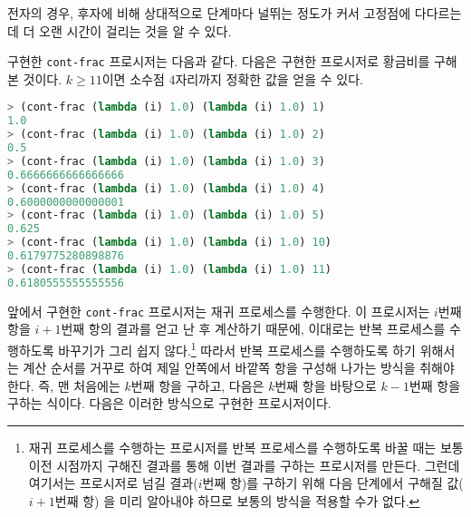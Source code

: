 전자의 경우, 후자에 비해 상대적으로 단계마다 널뛰는 정도가 커서 고정점에
다다르는데 더 오랜 시간이 걸리는 것을 알 수 있다.


\begin{MyEnum}
\item 구현한 \texttt{cont-frac} 프로시저는 다음과 같다.
  다음은 구현한 프로시저로 황금비를 구해본 것이다. $k \ge 11$이면 소수점
  4자리까지 정확한 값을 얻을 수 있다.
  \begin{lstlisting}[language=Scheme]
> (cont-frac (lambda (i) 1.0) (lambda (i) 1.0) 1)
1.0
> (cont-frac (lambda (i) 1.0) (lambda (i) 1.0) 2)
0.5
> (cont-frac (lambda (i) 1.0) (lambda (i) 1.0) 3)
0.6666666666666666
> (cont-frac (lambda (i) 1.0) (lambda (i) 1.0) 4)
0.6000000000000001
> (cont-frac (lambda (i) 1.0) (lambda (i) 1.0) 5)
0.625
> (cont-frac (lambda (i) 1.0) (lambda (i) 1.0) 10)
0.6179775280898876
> (cont-frac (lambda (i) 1.0) (lambda (i) 1.0) 11)
0.6180555555555556
  \end{lstlisting}
\item 앞에서 구현한 \texttt{cont-frac} 프로시저는 재귀 프로세스를
  수행한다. 이 프로시저는 $i$번째 항을 $i+1$번째 항의 결과를 얻고 난 후 계산하기 때문에,
  이대로는 반복 프로세스를 수행하도록 바꾸기가 그리 쉽지 않다.\footnote{재귀
    프로세스를 수행하는 프로시저를 반복 프로세스를 수행하도록 바꿀 때는 보통
    이전 시점까지 구해진 결과를 통해 이번 결과를 구하는 프로시저를 만든다.
    그런데 여기서는 프로시저로 넘길 결과($i$번째 항)를 구하기 위해
    다음 단계에서 구해질 값($i+1$번째 항) 을 미리 알아내야 하므로 보통의
    방식을 적용할 수가 없다.}
  따라서 반복 프로세스를 수행하도록 하기 위해서는 계산 순서를 거꾸로 하여
  제일 안쪽에서 바깥쪽 항을 구성해 나가는 방식을 취해야 한다. 즉, 맨
  처음에는 $k$번째 항을 구하고, 다음은 $k$번째 항을 바탕으로
  $k-1$번째 항을 구하는 식이다. 다음은 이러한 방식으로 구현한 프로시저이다.
\end{MyEnum}




